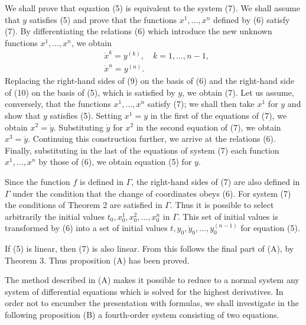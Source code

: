 \documentclass[10pt,a5paper]{book}
\theoremstyle{plain}
\theoremstyle{definition}
\theoremstyle{remark}
\begin{document}
We shall prove that equation (5) is equivalent to the system (7). We shall assume that $y$ satisfies (5) and prove that the functions $x^{1}, \ldots, x^{n}$ defined by (6) satisfy (7). By differentiating the relations (6) which introduce the new unknown functions $x^{1}, \ldots, x^{n}$, we obtain
\begin{align*}
& \dot{x}^{k}=y^{(k)}, \quad k=1, \ldots, n-1,  \tag{9}\\
& \dot{x}^{n}=y^{(n)} . \tag{10}
\end{align*}
Replacing the right-hand sides of (9) on the basis of (6) and the right-hand side of (10) on the basis of (5), which is satisfied by $y$, we obtain (7). Let us assume, conversely, that the functions $x^{1}, \ldots, x^{n}$ satisfy (7); we shall then take $x^{1}$ for $y$ and show that $y$ satisfies (5). Setting $x^{1}=y$ in the first of the equations of (7), we obtain $x^{2}=\dot{y}$. Substituting $\dot{y}$ for $x^{2}$ in the second equation of (7), we obtain $x^{3}=\ddot{y}$. Continuing this construction further, we arrive at the relations (6). Finally, substituting in
the last of the equations of system (7) each function $x^{1}, \ldots, x^{n}$ by those of (6), we obtain equation (5) for $y$.

Since the function $f$ is defined in $\Gamma$, the right-hand sides of (7) are also defined in $\Gamma$ under the condition that the change of coordinates obeys (6). For system (7) the conditions of Theorem 2 are satisfied in $\Gamma$. Thus it is possible to select arbitrarily the initial values $t_{0}, x_{0}^{1}, x_{0}^{2}, \ldots, x_{0}^{n}$ in $\Gamma$. This set of initial values is transformed by (6) into a set of initial values $t, y_{0}, \dot{y}_{0}, \ldots, y_{0}^{(n-1)}$ for equation (5).

If (5) is linear, then (7) is also linear. From this follows the final part of (A), by Theorem 3. Thus proposition (A) has been proved.

The method described in (A) makes it possible to reduce to a normal system any system of differential equations which is solved for the highest derivatives. In order not to encumber the presentation with formulas, we shall investigate in the following proposition (B) a fourth-order system consisting of two equations.
\end{document}
